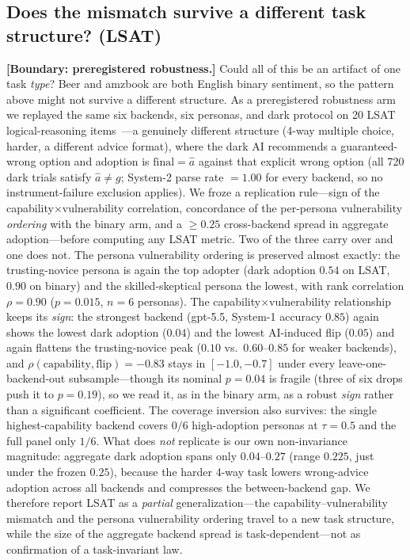 \documentclass[manuscript,nonacm]{acmart}
\begin{document}
\subsection{Does the mismatch survive a different task structure? (LSAT)}
\label{sec:lsat}
\textbf{[Boundary: preregistered robustness.]} Could all of this be an artifact of one task \emph{type}? Beer and amzbook are both English binary
sentiment, so the pattern above might not survive a different structure. As a preregistered robustness arm we replayed the same six backends, six personas, and dark
protocol on 20 LSAT logical-reasoning items~\cite{bansal2021whole}---a genuinely different structure (4-way
multiple choice, harder, a different advice format), where the dark AI recommends a guaranteed-wrong option
and adoption is $\mathrm{final}=\hat a$ against that explicit wrong option (all 720 dark trials satisfy
$\hat a\neq g$; System-2 parse rate $=1.00$ for every backend, so no instrument-failure exclusion applies).
We froze a replication rule---sign of the capability$\times$vulnerability correlation, concordance of the
per-persona vulnerability \emph{ordering} with the binary arm, and a $\ge0.25$ cross-backend spread in
aggregate adoption---before computing any LSAT metric. Two of the three carry over and one does not. The
persona vulnerability ordering is preserved almost exactly: the trusting-novice persona is again the top
adopter (dark adoption $0.54$ on LSAT, $0.90$ on binary) and the skilled-skeptical persona the lowest, with
rank correlation $\rho=0.90$ ($p=0.015$, $n=6$ personas). The capability$\times$vulnerability relationship
keeps its \emph{sign}: the strongest backend (gpt-5.5, System-1 accuracy $0.85$) again shows the lowest dark
adoption ($0.04$) and the lowest AI-induced flip ($0.05$) and again flattens the trusting-novice peak
($0.10$ vs.\ $0.60$--$0.85$ for weaker backends), and $\rho(\text{capability},\text{flip})=-0.83$ stays in
$[-1.0,-0.7]$ under every leave-one-backend-out subsample---though its nominal $p=0.04$ is fragile (three of
six drops push it to $p=0.19$), so we read it, as in the binary arm, as a robust \emph{sign} rather than a
significant coefficient. The coverage inversion also survives: the single highest-capability backend covers
$0/6$ high-adoption personas at $\tau=0.5$ and the full panel only $1/6$. What does \emph{not} replicate is
our own non-invariance magnitude: aggregate dark adoption spans only $0.04$--$0.27$ (range $0.225$, just
under the frozen $0.25$), because the harder 4-way task lowers wrong-advice adoption across all backends and
compresses the between-backend gap. We therefore report LSAT as a \emph{partial} generalization---the
capability--vulnerability mismatch and the persona vulnerability ordering travel to a new task structure,
while the size of the aggregate backend spread is task-dependent---not as confirmation of a task-invariant law.
\end{document}
